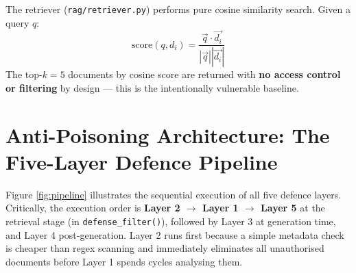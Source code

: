 The retriever (\texttt{rag/retriever.py}) performs pure cosine similarity search. Given a query $q$:
\begin{equation}
\text{score}(q, d_i) = \frac{\vec{q} \cdot \vec{d_i}}{|\vec{q}||\vec{d_i}|}
\end{equation}
The top-$k=5$ documents by cosine score are returned with \textbf{no access control or filtering} by design --- this is the intentionally vulnerable baseline.

\section{Anti-Poisoning Architecture: The Five-Layer Defence Pipeline}

Figure \ref{fig:pipeline} illustrates the sequential execution of all five defence layers. Critically, the execution order is \textbf{Layer 2 $\to$ Layer 1 $\to$ Layer 5} at the retrieval stage (in \texttt{defense\_filter()}), followed by Layer 3 at generation time, and Layer 4 post-generation. Layer 2 runs first because a simple metadata check is cheaper than regex scanning and immediately eliminates all unauthorised documents before Layer 1 spends cycles analysing them.


